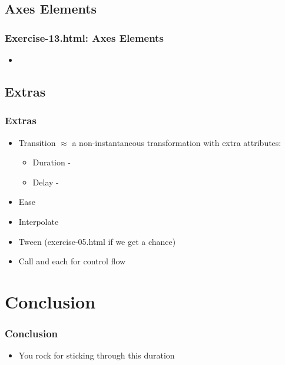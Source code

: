 \documentclass{beamer}
\begin{document}
\subsection{Axes Elements}

\begin{frame}
    \frametitle{Exercise-13.html: Axes Elements}
    \begin{itemize}
    \item 
    \end{itemize} 
\end{frame}



\subsection{Extras}

\begin{frame}
    \frametitle{Extras}
    \begin{itemize}
    \item Transition $\approx$ a non-instantaneous transformation with extra attributes:
        \begin{itemize}
        \item Duration - 
        \item Delay -  
        \end{itemize}
    \item Ease
    \item Interpolate
    \item Tween (exercise-05.html if we get a chance)
    \item Call and each for control flow 
    \end{itemize}
\end{frame}



\section{Conclusion}

\begin{frame}
    \frametitle{Conclusion}
    \begin{itemize}
    \item You rock for sticking through this duration
    \end{itemize}
\end{frame}
\end{document}
